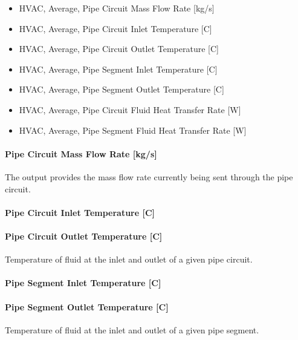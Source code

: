 \begin{itemize}
\item
  HVAC, Average, Pipe Circuit Mass Flow Rate {[}kg/s{]}
\item
  HVAC, Average, Pipe Circuit Inlet Temperature {[}C{]}
\item
  HVAC, Average, Pipe Circuit Outlet Temperature {[}C{]}
\item
  HVAC, Average, Pipe Segment Inlet Temperature {[}C{]}
\item
  HVAC, Average, Pipe Segment Outlet Temperature {[}C{]}
\item
  HVAC, Average, Pipe Circuit Fluid Heat Transfer Rate {[}W{]}
\item
  HVAC, Average, Pipe Segment Fluid Heat Transfer Rate {[}W{]}
\end{itemize}

\paragraph{Pipe Circuit Mass Flow Rate {[}kg/s{]}}\label{pipe-circuit-mass-flow-rate-kgs}

The output provides the mass flow rate currently being sent through the pipe circuit.

\paragraph{Pipe Circuit Inlet Temperature {[}C{]}}\label{pipe-circuit-inlet-temperature-c}

\paragraph{Pipe Circuit Outlet Temperature {[}C{]}}\label{pipe-circuit-outlet-temperature-c}

Temperature of fluid at the inlet and outlet of a given pipe circuit.

\paragraph{Pipe Segment Inlet Temperature {[}C{]}}\label{pipe-segment-inlet-temperature-c}

\paragraph{Pipe Segment Outlet Temperature {[}C{]}}\label{pipe-segment-outlet-temperature-c}

Temperature of fluid at the inlet and outlet of a given pipe segment.

